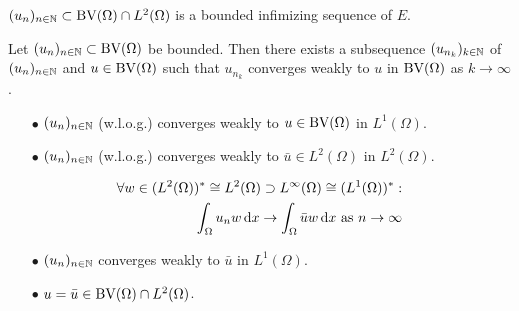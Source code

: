 \documentclass[xcolor=svgnames,english]{beamer}
\begin{document}
\begin{frame}
  $(u_n)_{n\in\mathbb{N}}\subset\textup{BV}(\Omega)\cap L^2(\Omega)$ is a bounded 
  infimizing sequence of $E$.
  \pause
  \begin{block}{}
    Let $(u_n)_{n\in\mathbb{N}}\subset \textup{BV}(\Omega)$ be bounded. Then there
    exists a subsequence $(u_{n_k})_{k\in\mathbb{N}}$ of $(u_n)_{n\in\mathbb{N}}$ and
    $u\in\textup{BV}(\Omega)$
    such that $u_{n_k}$ converges weakly to $u$ in $\textup{BV}(\Omega)$ as
    $k\rightarrow\infty$.
  \end{block}

  \begin{itemize}
    \item[$\bullet$] $(u_n)_{n\in\mathbb{N}}$ (w.l.o.g.) converges weakly to
      $u\in\textup{BV}(\Omega)$ in $L^1(\Omega)$.
      \pause
    \item[$\bullet$] $(u_n)_{n\in\mathbb{N}}$ (w.l.o.g.) converges weakly to
      $\bar{u}\in L^2(\Omega)$ in $L^2(\Omega)$.
  \end{itemize}
  \pause
  \begin{align*}
    \forall w\in (L^2(\Omega))^\ast\cong L^2(\Omega)
    \supset L^\infty(\Omega)\cong (L^1(\Omega))^\ast:\\
    \int_\Omega u_n w\,\mathrm{d}x\to \int_\Omega \bar{u} w\,\mathrm{d}x \text{ as } n\to\infty
  \end{align*}
  \pause
  \begin{itemize}
    \item[$\bullet$] $(u_n)_{n\in\mathbb{N}}$ converges weakly to $\bar{u}$ in
      $L^1(\Omega)$.
      \pause
    \item[$\bullet$] $u=\bar{u}\in \textup{BV}(\Omega)\cap L^2(\Omega)$.
  \end{itemize}
\end{frame}
\end{document}
